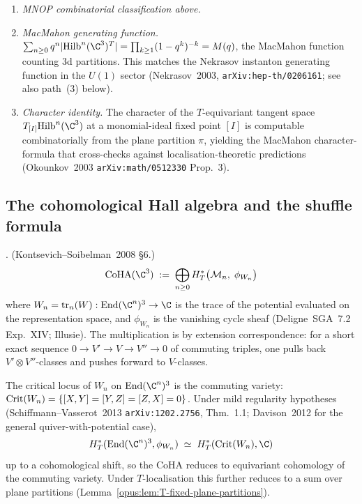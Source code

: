 \begin{verification}
\label{opus:verif:plane-partitions}
\mbox{}
\begin{enumerate}
\item \emph{MNOP combinatorial classification above.}
\item \emph{MacMahon generating function.} $\sum_{n \geq 0} q^n |\Hilb^n(\C^3)^T| = \prod_{k \geq 1}(1 - q^k)^{-k}
= M(q)$, the MacMahon function counting 3d partitions. This matches the Nekrasov
instanton generating function in the $U(1)$ sector (Nekrasov~2003,
\texttt{arXiv:hep-th/0206161}; see also path~(3) below).
\item \emph{Character identity.} The character of the $T$-equivariant tangent
space $T_{[I]}\Hilb^n(\C^3)$ at a monomial-ideal fixed point $[I]$ is computable
combinatorially from the plane partition $\pi$, yielding the MacMahon
character-formula that cross-checks against localisation-theoretic predictions
(Okounkov~2003 \texttt{arXiv:math/0512330} Prop.~3).
\end{enumerate}
\end{verification}

\subsection{The cohomological Hall algebra and the shuffle formula}
\label{opus:sec:coha-shuffle}

\begin{definition}
\label{opus:def:coha-critical}
\ClaimStatusDefinition. (Kontsevich--Soibelman~2008 \S6.)
\[
 \CoHA(\C^3) \;:=\; \bigoplus_{n \geq 0} H^*_T\bigl(\mathcal{M}_n,\; \phi_{W_n}\bigr)
\]
where $W_n = \mathrm{tr}_n(W) : \operatorname{End}(\C^n)^3 \to \C$ is the trace of the potential
evaluated on the representation space, and $\phi_{W_n}$ is the vanishing cycle sheaf
(Deligne~SGA~7.2 Exp.~XIV; Illusie). The multiplication is by extension correspondence:
for a short exact sequence $0 \to V' \to V \to V'' \to 0$ of commuting triples,
one pulls back $V' \otimes V''$-classes and pushes forward to $V$-classes.
\end{definition}

\begin{remark}
\label{opus:rem:vanishing-cycle-localisation}
The critical locus of $W_n$ on $\operatorname{End}(\C^n)^3$ is the commuting variety:
$\mathrm{Crit}(W_n) = \{[X,Y] = [Y,Z] = [Z,X] = 0\}$. Under mild regularity hypotheses
(Schiffmann--Vasserot~2013 \texttt{arXiv:1202.2756}, Thm.~1.1; Davison~2012
for the general quiver-with-potential case),
\[
 H^*_T(\operatorname{End}(\C^n)^3, \phi_{W_n}) \;\simeq\; H^*_T(\Crit(W_n), \C)
\]
up to a cohomological shift, so the CoHA reduces to equivariant cohomology of
the commuting variety. Under $T$-localisation this further reduces to a sum
over plane partitions (Lemma~\ref{opus:lem:T-fixed-plane-partitions}).
\end{remark}

